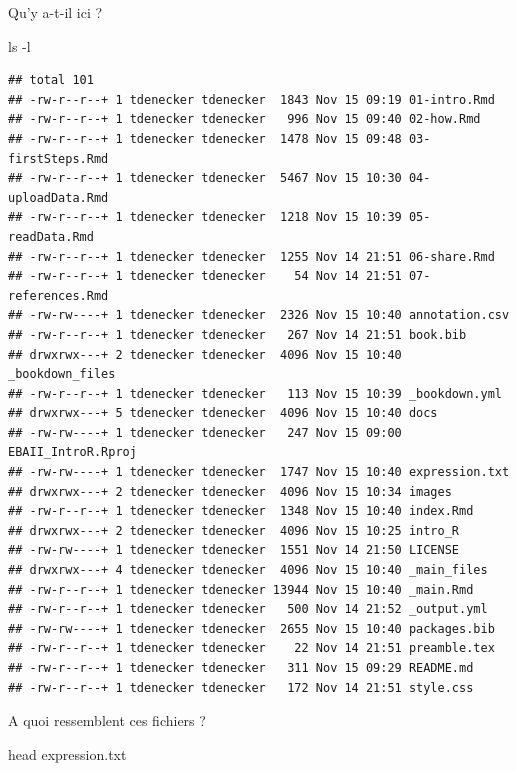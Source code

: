 \documentclass[
]{book}
\newenvironment{Shaded}{\begin{snugshade}}{\end{snugshade}}
\newcommand{\AttributeTok}[1]{\textcolor[rgb]{0.77,0.63,0.00}{#1}}
\newcommand{\FunctionTok}[1]{\textcolor[rgb]{0.00,0.00,0.00}{#1}}
\newcommand{\NormalTok}[1]{#1}
\begin{document}
Qu'y a-t-il ici ?

\begin{Shaded}
\begin{Highlighting}[]
\FunctionTok{ls} \AttributeTok{{-}l}
\end{Highlighting}
\end{Shaded}

\begin{verbatim}
## total 101
## -rw-r--r--+ 1 tdenecker tdenecker  1843 Nov 15 09:19 01-intro.Rmd
## -rw-r--r--+ 1 tdenecker tdenecker   996 Nov 15 09:40 02-how.Rmd
## -rw-r--r--+ 1 tdenecker tdenecker  1478 Nov 15 09:48 03-firstSteps.Rmd
## -rw-r--r--+ 1 tdenecker tdenecker  5467 Nov 15 10:30 04-uploadData.Rmd
## -rw-r--r--+ 1 tdenecker tdenecker  1218 Nov 15 10:39 05-readData.Rmd
## -rw-r--r--+ 1 tdenecker tdenecker  1255 Nov 14 21:51 06-share.Rmd
## -rw-r--r--+ 1 tdenecker tdenecker    54 Nov 14 21:51 07-references.Rmd
## -rw-rw----+ 1 tdenecker tdenecker  2326 Nov 15 10:40 annotation.csv
## -rw-r--r--+ 1 tdenecker tdenecker   267 Nov 14 21:51 book.bib
## drwxrwx---+ 2 tdenecker tdenecker  4096 Nov 15 10:40 _bookdown_files
## -rw-r--r--+ 1 tdenecker tdenecker   113 Nov 15 10:39 _bookdown.yml
## drwxrwx---+ 5 tdenecker tdenecker  4096 Nov 15 10:40 docs
## -rw-rw----+ 1 tdenecker tdenecker   247 Nov 15 09:00 EBAII_IntroR.Rproj
## -rw-rw----+ 1 tdenecker tdenecker  1747 Nov 15 10:40 expression.txt
## drwxrwx---+ 2 tdenecker tdenecker  4096 Nov 15 10:34 images
## -rw-r--r--+ 1 tdenecker tdenecker  1348 Nov 15 10:40 index.Rmd
## drwxrwx---+ 2 tdenecker tdenecker  4096 Nov 15 10:25 intro_R
## -rw-rw----+ 1 tdenecker tdenecker  1551 Nov 14 21:50 LICENSE
## drwxrwx---+ 4 tdenecker tdenecker  4096 Nov 15 10:40 _main_files
## -rw-r--r--+ 1 tdenecker tdenecker 13944 Nov 15 10:40 _main.Rmd
## -rw-r--r--+ 1 tdenecker tdenecker   500 Nov 14 21:52 _output.yml
## -rw-rw----+ 1 tdenecker tdenecker  2655 Nov 15 10:40 packages.bib
## -rw-r--r--+ 1 tdenecker tdenecker    22 Nov 14 21:51 preamble.tex
## -rw-r--r--+ 1 tdenecker tdenecker   311 Nov 15 09:29 README.md
## -rw-r--r--+ 1 tdenecker tdenecker   172 Nov 14 21:51 style.css
\end{verbatim}

A quoi ressemblent ces fichiers ?

\begin{Shaded}
\begin{Highlighting}[]
\FunctionTok{head}\NormalTok{ expression.txt}
\end{Highlighting}
\end{Shaded}
\end{document}
